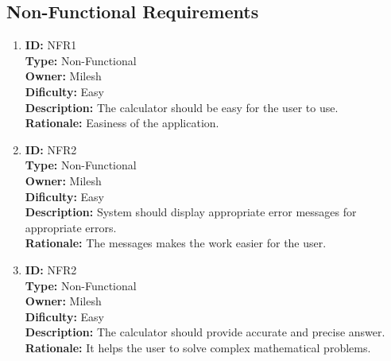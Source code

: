\documentclass[
	12pt
]{article}
\begin{document}
\subsection{Non-Functional Requirements}
\begin{enumerate}
\item\textbf{ID:} NFR1\\
    \textbf{Type:} Non-Functional\\
    \textbf{Owner:} Milesh\\
    \textbf{Dificulty:}  Easy\\
    \textbf{Description:} The calculator should be easy for the user to use.\\
    \textbf{Rationale:} Easiness of the application.
    
    \item\textbf{ID:} NFR2\\
    \textbf{Type:} Non-Functional\\
    \textbf{Owner:} Milesh\\
    \textbf{Dificulty:}  Easy\\
    \textbf{Description:} System should display appropriate error messages for appropriate errors.\\
    \textbf{Rationale:} The messages makes the work easier for the user.
    
\item\textbf{ID:} NFR2\\
    \textbf{Type:} Non-Functional\\
    \textbf{Owner:} Milesh\\
    \textbf{Dificulty:}  Easy\\
    \textbf{Description:} The calculator should provide accurate and precise answer.\\
    \textbf{Rationale:} It helps the user to solve complex mathematical problems.
\end{enumerate}
\end{document}
